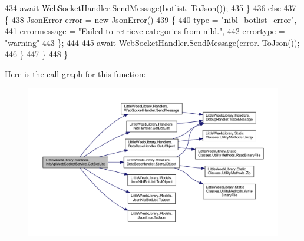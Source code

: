 \begin{DoxyCode}
434                     await \mbox{\hyperlink{class_little_weeb_library_1_1_handlers_1_1_web_socket_handler}{WebSocketHandler}}.\mbox{\hyperlink{class_little_weeb_library_1_1_handlers_1_1_web_socket_handler_a1de289d54d665a32c93478c68d3e6ad0}{SendMessage}}(botlist.
      \mbox{\hyperlink{class_little_weeb_library_1_1_models_1_1_json_nibl_bot_list_a852d40e99ff93888a16fdba1d45aee14}{ToJson}}());
435                 \}
436                 \textcolor{keywordflow}{else}
437                 \{
438                     \mbox{\hyperlink{class_little_weeb_library_1_1_models_1_1_json_error}{JsonError}} error = \textcolor{keyword}{new} \mbox{\hyperlink{class_little_weeb_library_1_1_models_1_1_json_error}{JsonError}}()
439                     \{
440                         type = \textcolor{stringliteral}{"nibl\_botlist\_error"},
441                         errormessage = \textcolor{stringliteral}{"Failed to retrieve categories from nibl."},
442                         errortype = \textcolor{stringliteral}{"warning"}
443                     \};
444 
445                     await \mbox{\hyperlink{class_little_weeb_library_1_1_handlers_1_1_web_socket_handler}{WebSocketHandler}}.\mbox{\hyperlink{class_little_weeb_library_1_1_handlers_1_1_web_socket_handler_a1de289d54d665a32c93478c68d3e6ad0}{SendMessage}}(error.
      \mbox{\hyperlink{class_little_weeb_library_1_1_models_1_1_json_error_a0e3e7dd2e2990404b7f0461742b23440}{ToJson}}());
446                 \}
447             \}            
448         \}
\end{DoxyCode}
Here is the call graph for this function\+:\nopagebreak
\begin{figure}[H]
\begin{center}
\leavevmode
\includegraphics[width=350pt]{class_little_weeb_library_1_1_services_1_1_info_api_web_socket_service_a5f91364bc403db5d521f15881a385143_cgraph}
\end{center}
\end{figure}
